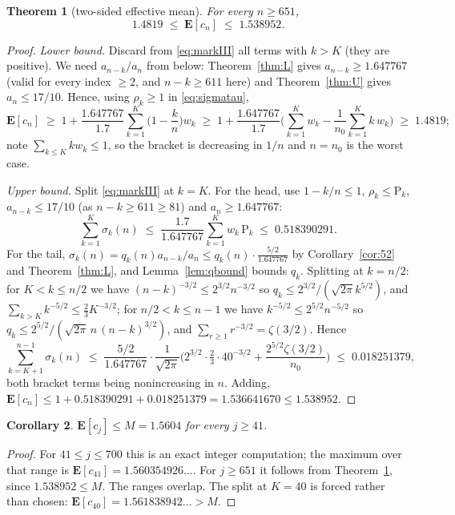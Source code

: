 \documentclass[11pt,a4paper]{amsart}
\theoremstyle{plain}
\newtheorem{theorem}{Theorem}[section]
\newtheorem{corollary}[theorem]{Corollary}
\theoremstyle{definition}
\newcommand{\EX}{\mathbf{E}}
\begin{document}
\begin{theorem}[two-sided effective mean]\label{thm:mean}
For every $n \ge 651$,
\[
  1.4819 \;\le\; \EX[c_n] \;\le\; 1.538952 .
\]
\end{theorem}

\begin{proof}
\emph{Lower bound.} Discard from \eqref{eq:markIII} all terms with $k>K$ (they
are positive). We need $a_{n-k}/a_n$ from below: Theorem~\ref{thm:L} gives
$a_{n-k}\ge 1.647767$ (valid for every index $\ge2$, and $n-k \ge 611$ here) and
Theorem~\ref{thm:U} gives $a_n \le 17/10$. Hence, using $\rho_k \ge 1$ in
\eqref{eq:sigmatau},
\[
  \EX[c_n] \;\ge\; 1+\frac{1.647767}{1.7}\sum_{k=1}^{K}\Big(1-\frac kn\Big)w_k
  \;\ge\; 1+\frac{1.647767}{1.7}
          \Big(\sum_{k=1}^{K}w_k-\frac{1}{n_0}\sum_{k=1}^{K}k\,w_k\Big)
  \;\ge\; 1.4819 ;
\]
note $\sum_{k \le K}k w_k \le 1$, so the bracket is decreasing in $1/n$ and
$n=n_0$ is the worst case.

\emph{Upper bound.} Split \eqref{eq:markIII} at $k=K$. For the head, use
$1-k/n \le 1$, $\rho_k \le \mathrm{P}_k$, $a_{n-k}\le 17/10$ (as $n-k\ge611\ge81$)
and $a_n \ge 1.647767$:
\[
  \sum_{k=1}^{K}\sigma_k(n)
  \;\le\; \frac{1.7}{1.647767}\sum_{k=1}^{K}w_k\,\mathrm{P}_k
  \;\le\; 0.518390291 .
\]
For the tail, $\sigma_k(n) = q_k(n)a_{n-k}/a_n \le q_k(n)\cdot
\frac{5/2}{1.647767}$ by Corollary~\ref{cor:52} and Theorem~\ref{thm:L}, and
Lemma~\ref{lem:qbound} bounds $q_k$. Splitting at $k=n/2$: for
$K<k\le n/2$ we have $(n-k)^{-3/2}\le 2^{3/2}n^{-3/2}$ so
$q_k \le 2^{3/2}/(\sqrt{2\pi}k^{5/2})$, and
$\sum_{k>K}k^{-5/2}\le\tfrac23 K^{-3/2}$; for $n/2<k\le n-1$ we have
$k^{-5/2}\le 2^{5/2}n^{-5/2}$ so $q_k \le
2^{5/2}/(\sqrt{2\pi}\,n\,(n-k)^{3/2})$, and $\sum_{r\ge1}r^{-3/2}=\zeta(3/2)$.
Hence
\[
  \sum_{k=K+1}^{n-1}\sigma_k(n)
  \;\le\; \frac{5/2}{1.647767}\cdot\frac{1}{\sqrt{2\pi}}
          \Big(2^{3/2}\cdot\tfrac{2}{3}\cdot 40^{-3/2}
             + \frac{2^{5/2}\zeta(3/2)}{n_0}\Big)
  \;\le\; 0.018251379 ,
\]
both bracket terms being nonincreasing in $n$. Adding,
$\EX[c_n]\le 1+0.518390291+0.018251379 = 1.536641670 \le 1.538952$.
\end{proof}

\begin{corollary}\label{cor:M}
$\EX[c_j] \le M = 1.5604$ for every $j \ge 41$.
\end{corollary}

\begin{proof}
For $41 \le j \le 700$ this is an exact integer computation; the maximum over
that range is $\EX[c_{41}] = 1.560354926\ldots$. For $j \ge 651$ it follows from
Theorem~\ref{thm:mean}, since $1.538952 \le M$. The ranges overlap. The split at
$K=40$ is forced rather than chosen: $\EX[c_{40}] = 1.561838942\ldots > M$.
\end{proof}
\end{document}
